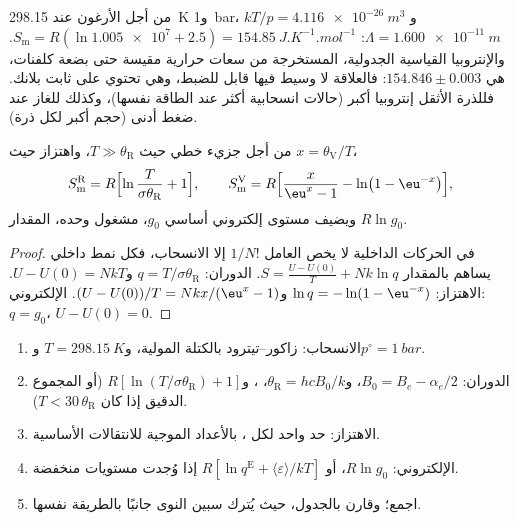 من أجل الأرغون عند \qty{298.15}{K} و\qty{1}{bar}، $kT/p = \qty{4.116e-26}{m^3}$ و$\Lambda =
\qty{1.600e-11}{m}$: $S_{\mathrm m} = R(\ln\num{1.005e7} + 2.5) = \qty{154.85}{J.K^{-1}.mol^{-1}}$. 
والإنتروبيا القياسية الجدولية، المستخرجة من سعات حرارية مقيسة حتى
بضعة كلفنات، هي $154.846 \pm 0.003$: فالعلاقة لا وسيط فيها قابل للضبط، 
وهي تحتوي على ثابت بلانك. فللذرة الأثقل إنتروبيا أكبر (حالات
انسحابية أكثر عند الطاقة نفسها)، وكذلك للغاز عند ضغط أدنى
(حجم أكبر لكل ذرة).

\begin{proposition}\label{prop:b3:partition-functions:modes-entropy}
من أجل جزيء خطي حيث $T \gg \theta_{\mathrm R}$، واهتزاز حيث $x = \theta_{\mathrm V}/T$،
\[
  S^{\mathrm R}_{\mathrm m} = R\Bigl[\ln\frac{T}{\sigma\theta_{\mathrm R}} + 1\Bigr],
  \qquad
  S^{\mathrm V}_{\mathrm m} = R\Bigl[\frac{x}{\eu^x - 1} - \ln\bigl(1 - \eu^{-x}\bigr)\Bigr],
\]
ويضيف مستوى إلكتروني أساسي  $g_0$، مشغول وحده، المقدار $R\ln g_0$.
\end{proposition}

\begin{proof}
في الحركات الداخلية لا يخص العامل $1/N!$ إلا الانسحاب، فكل
نمط داخلي يساهم بالمقدار $S = \frac{U - U(0)}{T} + Nk\ln q$. الدوران:
$q = T/\sigma\theta_{\mathrm R}$ و$U - U(0) = NkT$. الاهتزاز: $\ln q = -\ln(1 - \eu^{-x})$ 
و$(U - U(0))/T = Nkx/(\eu^x - 1)$. الإلكتروني: $q = g_0$، $U - U(0) = 0$.
\end{proof}

\begin{method}\label{met:b3:partition-functions:standard-entropy}
\begin{enumerate}
  \item الانسحاب: زاكور--تيترود بالكتلة المولية، و$T = \qty{298.15}{K}$ 
        و$p^\circ = \qty{1}{bar}$.
  \item الدوران: $B_0 = B_e - \alpha_e/2$، و$\theta_{\mathrm R} = hcB_0/k$، ،
        و$R[\ln(T/\sigma\theta_{\mathrm R}) + 1]$ (أو المجموع الدقيق إذا كان $T < 30\,\theta_{\mathrm R}$).
  \item الاهتزاز: حد واحد لكل ، بالأعداد الموجية للانتقالات الأساسية.
  \item الإلكتروني: $R\ln g_0$، أو $R[\ln q^{\mathrm E} + \langle\varepsilon\rangle/kT]$ إذا وُجدت مستويات منخفضة.
  \item اجمع؛ وقارن بالجدول، حيث يُترك سبين النوى جانبًا بالطريقة نفسها.
\end{enumerate}
\end{method}

